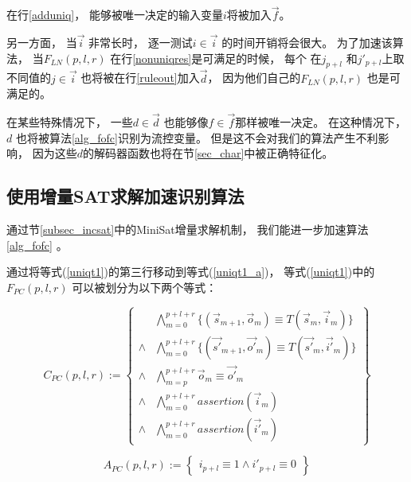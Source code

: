 在行\ref{adduniq}，
能够被唯一决定的输入变量$i$将被加入$\vec{f}$。

另一方面，
当$\vec{i}$ 非常长时，
逐一测试$i\in\vec{i}$ 的时间开销将会很大。
为了加速该算法，
当$F_{LN}(p,l,r)$ 在行\ref{nonuniqres}是可满足的时候，
每个 在$j_{p+l}$ 和$j'_{p+l}$上取不同值的$j\in\vec{i}$
也将被在行\ref{ruleout}加入$\vec{d}$，
因为他们自己的$F_{LN}(p,l,r)$ 也是可满足的。

在某些特殊情况下，
一些$d\in \vec{d}$ 也能够像$f\in \vec{f}$那样被唯一决定。
在这种情况下，
$d$ 也将被算法\ref{alg_fofc}识别为流控变量。
但是这不会对我们的算法产生不利影响，
因为这些$d$的解码器函数也将在节\ref{sec_char}中被正确特征化。


\subsection{使用增量SAT求解加速识别算法}\label{incSAT}

通过节\ref{subsec_incsat}中的MiniSat增量求解机制，
我们能进一步加速算法\ref{alg_fofc} 。

通过将等式(\ref{uniqt1})的第三行移动到等式(\ref{uniqt1_a})，
等式(\ref{uniqt1})中的$F_{PC}(p,l,r)$  可以被划分为以下两个等式：

\begin{equation}\label{uniqt1_f}
C_{PC}(p,l,r):=
\left\{
\begin{array}{cc}
&\bigwedge_{m=0}^{p+l+r}
\{
(\vec{s}_{m+1},\vec{o}_m)\equiv T(\vec{s}_m,\vec{i}_m)
\}
\\
\wedge&\bigwedge_{m=0}^{p+l+r}
\{
(\vec{s'}_{m+1},\vec{o'}_m)\equiv T(\vec{s'}_m,\vec{i'}_m)
\}
\\
\wedge&\bigwedge_{m=p}^{p+l+r}\vec{o}_m\equiv \vec{o'}_m \\
\wedge&\bigwedge_{m=0}^{p+l+r}assertion(\vec{i}_m) \\
\wedge&\bigwedge_{m=0}^{p+l+r}assertion(\vec{i'}_m)
\end{array}
\right\}
\end{equation}

\begin{equation}\label{uniqt1_a}
A_{PC}(p,l,r):=
\left\{
\begin{array}{c}
 i_{p+l}\equiv 1 \wedge  i'_{p+l}\equiv 0
\end{array}
\right\}
\end{equation}

